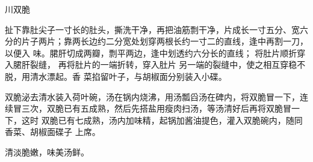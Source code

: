 \begin{recipe}{川双脆}

\ingredients


\preparation

\step 扯下靠肚尖子一寸长的肚头，撕洗干净，再把油筋剽干净，片成长一寸五分、宽六
分的片子两片；靠两长边约二分宽处划穿两根长约一寸二的直线，逢中再割一刀，以便入
味。𬂁肝切成两瓣，剽平两边，逢中划透约六分长的直线； 将肚片顺折穿入𬂁肝裂缝，
再将肚片的一端折转，穿入肚片 另一端的裂缝中，使之相互穿稳不脱，用清水漂起。香
菜掐留叶子，与胡椒面分别装入小碟。

\step 双脆泌去清水装入荷叶碗，汤在锅内烧沸，用汤瓢舀汤在碑内，将双脆冒一下，连
续冒三次，双脆已有五成熟，然后先搭盐用瘦肉扫汤，等汤清好后再将双脆冒一下，这时
双脆已有七成熟，汤内加味精，起锅加酱油提色，灌入双脆碗内，随同香菜、胡椒面碟子
上席。

\features

清淡脆嫩，味美汤鲜。

\end{recipe}

